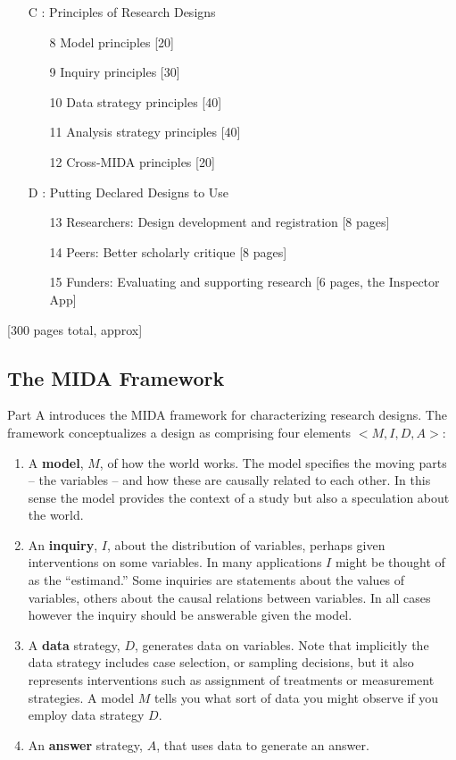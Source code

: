 \documentclass[11pt]{article}
\begin{document}
\begin{framed}
\begin{enumerate}
		\item[C]: Principles of Research Designs
		\begin{enumerate}
			\item[8] Model principles [20]
			\item[9] Inquiry principles [30]
			\item[10] Data strategy principles [40]
			\item[11] Analysis strategy principles [40]
			\item[12] Cross-MIDA principles [20]
		\end{enumerate}
	\item[D]: Putting Declared Designs to Use
				\begin{enumerate}
					\item[13] Researchers: Design development and registration [8 pages]				
					\item[14]  Peers: Better scholarly critique [8 pages]
          \item[15]  Funders: Evaluating and supporting research [6 pages, the Inspector App]   
				\end{enumerate}
				
	\end{enumerate}
	[300 pages total, approx]
\end{framed}


\subsection{The MIDA Framework}

Part A introduces the MIDA framework for characterizing research designs. The framework conceptualizes a design as comprising four elements $<M,I,D,A>$:
\begin{enumerate}
	
	\item A \textbf{model}, $M$, of how the world works. The model specifies the moving parts -- the variables -- and how these are causally related to each other. In this sense the model provides the context of a study but also a speculation about the world.    
	\item An \textbf{inquiry}, $I$, about the distribution of variables, perhaps given interventions on some variables.  In many applications $I$ might be thought of as the ``estimand.'' Some inquiries are statements about the values of variables, others about the causal relations between variables. In all cases however the inquiry should be answerable given the model.   
	\item A \textbf{data} strategy, $D$, generates data on variables.  Note that implicitly the data strategy includes case selection, or sampling decisions, but it also represents interventions such as assignment of treatments or measurement strategies. A model $M$ tells you what sort of data you might observe if you employ data strategy $D$.  
	\item An \textbf{answer} strategy, $A$, that uses data to generate an answer.  
\end{enumerate}
\end{document}
